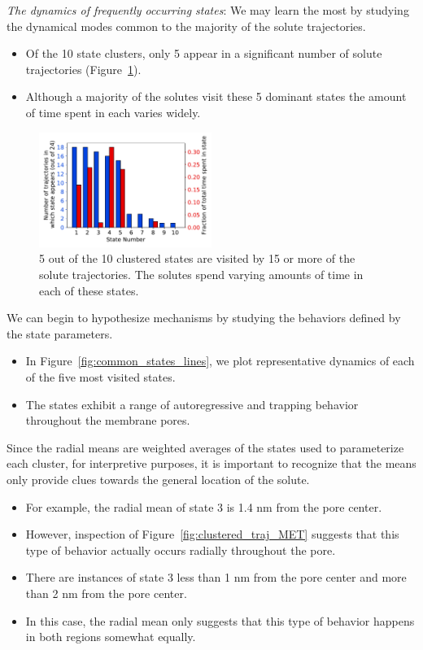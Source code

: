 \documentclass[journal=jpcbfk,manuscript=article]{achemso}
\begin{document}
  \textit{The dynamics of frequently occurring states}: We may learn the most by 
  studying the dynamical modes common to the majority of the solute trajectories.
  \begin{itemize}
  	\item Of the 10 state clusters, only 5 appear in a significant number of 
  	solute trajectories (Figure~\ref{fig:prevalence}).
  	\item Although a majority of the solutes visit these 5 dominant states the
  	amount of time spent in each varies widely. 
  \end{itemize} 
  
  \begin{figure}
  \centering
  \includegraphics[width=0.5\textwidth]{prevalence.pdf}
  \caption{5 out of the 10 clustered states are visited by 15 or more of the solute
  trajectories. The solutes spend varying amounts of time in each of these states.
  }
  \label{fig:prevalence}
  \end{figure}
  
  We can begin to hypothesize mechanisms by studying the behaviors defined by the 
  state parameters.
  \begin{itemize}
  	\item In Figure~\ref{fig:common_states_lines}, we plot representative 
  	dynamics of each of the five most visited states.
  	\item The states exhibit a range of autoregressive and trapping behavior
  	throughout the membrane pores.
  \end{itemize}
  
  Since the radial means are weighted averages of the states used to parameterize
  each cluster, for interpretive purposes, it is important to recognize that the means
  only provide clues towards the general location of the solute. 
  \begin{itemize}
  	\item For example, the radial mean of state 3 is 1.4 nm from the pore center. 
  	\item However, inspection of Figure~\ref{fig:clustered_traj_MET} suggests that this 
  	type of behavior actually occurs radially throughout the pore.
  	\item There are instances of state 3 less than 1 nm from the pore center and more 
  	than 2 nm from the pore center. 
  	\item In this case, the radial mean only suggests that this type of behavior 
  	happens in both regions somewhat equally.
  \end{itemize}
  
\end{document}

